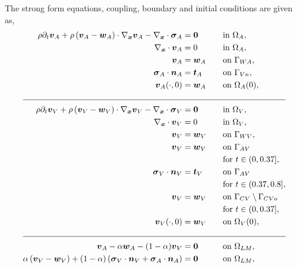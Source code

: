 \documentclass[3p]{elsarticle}
\begin{document}
The strong form equations, coupling, boundary and initial conditions are given as,
\begin{alignat}{4}
    \rho \partial_t \boldsymbol{v}_A
    + \rho \left( \boldsymbol{v}_A - \boldsymbol{w}_A \right) \cdot \nabla_{\boldsymbol{x}} \boldsymbol{v}_A
    - \nabla_{\boldsymbol{x}} \cdot \boldsymbol{\sigma}_A
    &= \boldsymbol{0}
    &&\quad \text{in } \Omega_A, \label{lv-atrium-momentum-eqn} \\
    \nabla_{\boldsymbol{x}} \cdot \boldsymbol{v}_A
    &= 0
    &&\quad \text{in } \Omega_A, \label{lv-atrium-div-eqn} \\
    \boldsymbol{v}_A
    &= \boldsymbol{w}_A
    &&\quad \text{on } \Gamma_{WA}, \\
    \boldsymbol{\sigma}_A \cdot \boldsymbol{n}_A
    &= \boldsymbol{t}_A
    &&\quad \text{on } \Gamma_{Vn}, \label{lv-atrium-veins-BC-eqn} \\
    \boldsymbol{v}_A (\cdot, 0)
    &= \boldsymbol{w}_A
    &&\quad \text{on } \Omega_A (0), \\
        \cline{1-4}
        \rho \partial_t \boldsymbol{v}_V
    + \rho \left( \boldsymbol{v}_V - \boldsymbol{w}_V \right) \cdot \nabla_{\boldsymbol{x}} \boldsymbol{v}_V
    - \nabla_{\boldsymbol{x}} \cdot \boldsymbol{\sigma}_V
    &= \boldsymbol{0}
    &&\quad \text{in } \Omega_V, \label{lv-ventricle-momentum-eqn} \\
    \nabla_{\boldsymbol{x}} \cdot \boldsymbol{v}_V
    &= 0
    &&\quad \text{in } \Omega_V, \label{lv-ventricle-div-eqn} \\
    \boldsymbol{v}_V
    &= \boldsymbol{w}_V
    &&\quad \text{on } \Gamma_{WV}, \\
    \boldsymbol{v}_V
    &= \boldsymbol{w}_V
    &&\quad \text{on } \Gamma_{AV} \nonumber \\
    &&&\quad \text{for } t \in (0, 0.37], \label{lv-ventricle-aortic-valve-BC-diastole-eqn} \\
    \boldsymbol{\sigma}_V \cdot \boldsymbol{n}_V
    &= \boldsymbol{t}_V
    &&\quad \text{on } \Gamma_{AV} \nonumber \\
    &&&\quad \text{for } t \in (0.37, 0.8], \label{lv-ventricle-aortic-valve-BC-systole-eqn} \\
    \boldsymbol{v}_V
    &= \boldsymbol{w}_V
    &&\quad \text{on } \Gamma_{CV} \setminus \Gamma_{CVo} \nonumber \\
    &&&\quad \text{for } t \in (0, 0.37], \\
    \boldsymbol{v}_V (\cdot, 0)
    &= \boldsymbol{w}_V
    &&\quad \text{on } \Omega_V (0), \\
        \cline{1-4}
        \boldsymbol{v}_A
    - \alpha \boldsymbol{w}_A
    - (1 - \alpha) \boldsymbol{v}_V
    &= \boldsymbol{0}
    &&\quad \text{on } \Omega_{LM}, \label{lv-atrium-coupling-eqn} \\
                \alpha \left( \boldsymbol{v}_V - \boldsymbol{w}_V \right)
    + (1 - \alpha) \left( \boldsymbol{\sigma}_V \cdot \boldsymbol{n}_V + \boldsymbol{\sigma}_A \cdot \boldsymbol{n}_A \right)
    &= \boldsymbol{0}
    &&\quad \text{on } \Omega_{LM}, \label{lv-ventricle-coupling-eqn}
\end{alignat}
\end{document}
